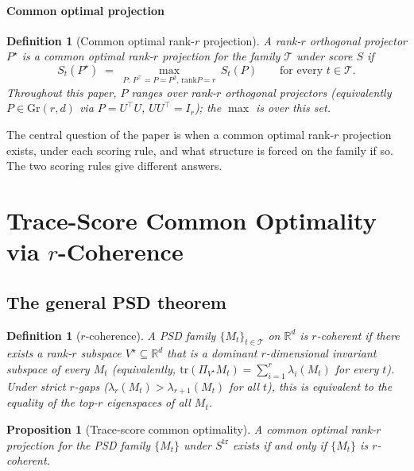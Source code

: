 \documentclass[final,3p,times]{elsarticle}
\newtheorem{proposition}[theorem]{Proposition}
\newtheorem{definition}[theorem]{Definition}
\newcommand{\Gr}{\mathrm{Gr}}
\newcommand{\tr}{\mathrm{tr}}
\newcommand{\R}{\mathbb{R}}
\newcommand{\rank}{\mathrm{rank}}
\begin{document}
\paragraph{Common optimal projection}
\begin{definition}[Common optimal rank-$r$ projection]\label{def:fgp}
A rank-$r$ orthogonal projector $P^\star$ is a \emph{common optimal
rank-$r$ projection} for the family $\mathcal{T}$ under score $S$ if
\begin{equation}
  S_t(P^\star) \;=\; \max_{P:\,P^\top=P=P^2,\,\rank P=r}\,S_t(P)
  \qquad\text{for every }t\in\mathcal{T}.
\end{equation}
Throughout this paper, $P$ ranges over rank-$r$ orthogonal projectors
(equivalently $P\in\Gr(r,d)$ via $P=U^\top U$, $UU^\top=I_r$); the
$\max$ is over this set.
\end{definition}

The central question of the paper is when a common optimal rank-$r$
projection exists, under each scoring rule, and what structure is forced
on the family if so.
The two scoring rules give different answers.

\section{Trace-Score Common Optimality via \texorpdfstring{$r$}{r}-Coherence}
\label{sec:pred}

\subsection{The general PSD theorem}

\begin{definition}[$r$-coherence]\label{def:rcoh}
A PSD family $\{M_t\}_{t\in\mathcal{T}}$ on $\R^d$ is \emph{$r$-coherent}
if there exists a rank-$r$ subspace $V^\star\subseteq\R^d$ that is a
dominant $r$-dimensional invariant subspace of every $M_t$ (equivalently,
$\tr(\Pi_{V^\star}M_t)=\sum_{i=1}^r\lambda_i(M_t)$ for every $t$).
Under strict $r$-gaps ($\lambda_r(M_t)>\lambda_{r+1}(M_t)$ for all $t$),
this is equivalent to the equality of the top-$r$ eigenspaces of all
$M_t$.
\end{definition}

\begin{proposition}[Trace-score common optimality]\label{thm:pred}
A common optimal rank-$r$ projection for the PSD family $\{M_t\}$ under
$S^{\mathrm{tr}}$ exists if and only if $\{M_t\}$ is $r$-coherent.
\end{proposition}
\end{document}
